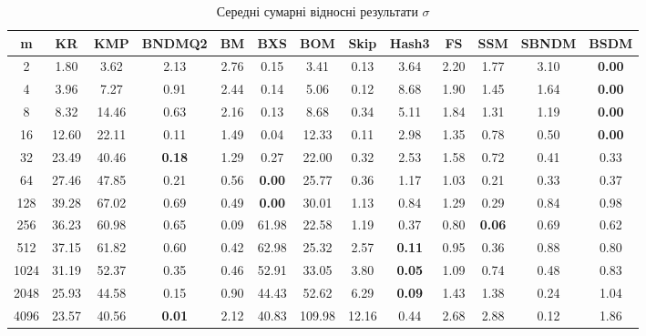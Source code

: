 \documentclass[a4paper,14pt]{extarticle} %
\begin{document}
				\begin{table}[H]
					\centering
					\scriptsize
					\begin{tabular}{|c|c|c|c|c|c|c|c|c|c|c|c|c|}
					\hline
					\textbf{m} & \textbf{KR} & \textbf{KMP} & \textbf{BNDMQ2} & \textbf{BM} & \textbf{BXS} & \textbf{BOM} & \textbf{Skip} & \textbf{Hash3} & \textbf{FS} & \textbf{SSM} & \textbf{SBNDM} & \textbf{BSDM} \\
					\hline
					2 & 1.80 & 3.62 & 2.13 & 2.76 & 0.15 & 3.41 & 0.13 & 3.64 & 2.20 & 1.77 & 3.10 & \textbf{0.00} \\
					\hline
					4 & 3.96 & 7.27 & 0.91 & 2.44 & 0.14 & 5.06 & 0.12 & 8.68 & 1.90 & 1.45 & 1.64 & \textbf{0.00} \\
					\hline
					8 & 8.32 & 14.46 & 0.63 & 2.16 & 0.13 & 8.68 & 0.34 & 5.11 & 1.84 & 1.31 & 1.19 & \textbf{0.00} \\
					\hline
					16 & 12.60 & 22.11 & 0.11 & 1.49 & 0.04 & 12.33 & 0.11 & 2.98 & 1.35 & 0.78 & 0.50 & \textbf{0.00} \\
					\hline
					32 & 23.49 & 40.46 & \textbf{0.18} & 1.29 & 0.27 & 22.00 & 0.32 & 2.53 & 1.58 & 0.72 & 0.41 & 0.33 \\
					\hline
					64 & 27.46 & 47.85 & 0.21 & 0.56 & \textbf{0.00} & 25.77 & 0.36 & 1.17 & 1.03 & 0.21 & 0.33 & 0.37 \\
					\hline
					128 & 39.28 & 67.02 & 0.69 & 0.49 & \textbf{0.00} & 30.01 & 1.13 & 0.84 & 1.29 & 0.29 & 0.84 & 0.98 \\
					\hline
					256 & 36.23 & 60.98 & 0.65 & 0.09 & 61.98 & 22.58 & 1.19 & 0.37 & 0.80 & \textbf{0.06} & 0.69 & 0.62 \\
					\hline
					512 & 37.15 & 61.82 & 0.60 & 0.42 & 62.98 & 25.32 & 2.57 & \textbf{0.11} & 0.95 & 0.36 & 0.88 & 0.80 \\
					\hline
					1024 & 31.19 & 52.37 & 0.35 & 0.46 & 52.91 & 33.05 & 3.80 & \textbf{0.05} & 1.09 & 0.74 & 0.48 & 0.83 \\
					\hline
					2048 & 25.93 & 44.58 & 0.15 & 0.90 & 44.43 & 52.62 & 6.29 & \textbf{0.09} & 1.43 & 1.38 & 0.24 & 1.04 \\
					\hline
					4096 & 23.57 & 40.56 & \textbf{0.01} & 2.12 & 40.83 & 109.98 & 12.16 & 0.44 & 2.68 & 2.88 & 0.12 & 1.86 \\
					\hline
					\end{tabular}
					\caption{Середні сумарні відносні результати $\sigma$}
					\label{table:relative_fullrandom}
					\end{table}
\end{document}
